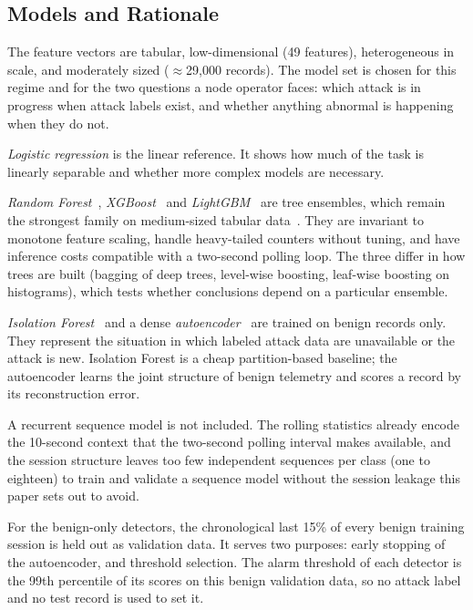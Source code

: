 \documentclass[journal]{IEEEtran}
\begin{document}
\subsection{Models and Rationale}\label{sec:models}
The feature vectors are tabular, low-dimensional (49 features), heterogeneous in scale, and moderately sized ($\approx$29{,}000 records). The model set is chosen for this regime and for the two questions a node operator faces: which attack is in progress when attack labels exist, and whether anything abnormal is happening when they do not.

\emph{Logistic regression} is the linear reference. It shows how much of the task is linearly separable and whether more complex models are necessary.

\emph{Random Forest}~\cite{breiman2001}, \emph{XGBoost}~\cite{chen2016} and \emph{LightGBM}~\cite{ke2017} are tree ensembles, which remain the strongest family on medium-sized tabular data~\cite{grinsztajn2022}. They are invariant to monotone feature scaling, handle heavy-tailed counters without tuning, and have inference costs compatible with a two-second polling loop. The three differ in how trees are built (bagging of deep trees, level-wise boosting, leaf-wise boosting on histograms), which tests whether conclusions depend on a particular ensemble.

\emph{Isolation Forest}~\cite{liu2008} and a dense \emph{autoencoder}~\cite{sakurada2014} are trained on benign records only. They represent the situation in which labeled attack data are unavailable or the attack is new. Isolation Forest is a cheap partition-based baseline; the autoencoder learns the joint structure of benign telemetry and scores a record by its reconstruction error.

A recurrent sequence model is not included. The rolling statistics already encode the 10-second context that the two-second polling interval makes available, and the session structure leaves too few independent sequences per class (one to eighteen) to train and validate a sequence model without the session leakage this paper sets out to avoid.

For the benign-only detectors, the chronological last 15\% of every benign training session is held out as validation data. It serves two purposes: early stopping of the autoencoder, and threshold selection. The alarm threshold of each detector is the 99th percentile of its scores on this benign validation data, so no attack label and no test record is used to set it.
\end{document}
